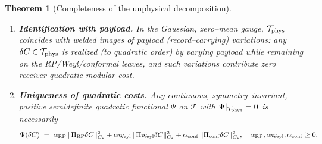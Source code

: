 \documentclass[10pt]{article}
\theoremstyle{definition}
\theoremstyle{plain}
\newtheorem{theorem}{Theorem}[section]
\begin{document}
\begin{theorem}[Completeness of the unphysical decomposition]
\begin{enumerate}[leftmargin=2.1em]
\item \textbf{Identification with payload.} In the Gaussian, zero–mean gauge, $\mathcal T_{\rm phys}$ coincides with welded images of payload (record–carrying) variations: any $\delta C\in\mathcal T_{\rm phys}$ is realized (to quadratic order) by varying payload while remaining on the RP/Weyl/conformal leaves, and such variations contribute zero \emph{receiver} quadratic modular cost.
\item \textbf{Uniqueness of quadratic costs.} Any continuous, symmetry–invariant, positive semidefinite quadratic functional $\Psi$ on $\mathscr T$ with $\Psi|_{\mathcal T_{\rm phys}}=0$ is necessarily
\[
\Psi(\delta C)\;=\;\alpha_{\rm RP}\,\|\Pi_{\rm RP}\delta C\|_{C_\ast}^2
+\alpha_{\rm Weyl}\,\|\Pi_{\rm Weyl}\delta C\|_{C_\ast}^2
+\alpha_{\rm conf}\,\|\Pi_{\rm conf}\delta C\|_{C_\ast}^2,\quad \alpha_{\rm RP},\alpha_{\rm Weyl},\alpha_{\rm conf}\ge 0.
\]
\end{enumerate}
\end{theorem}
\end{document}
